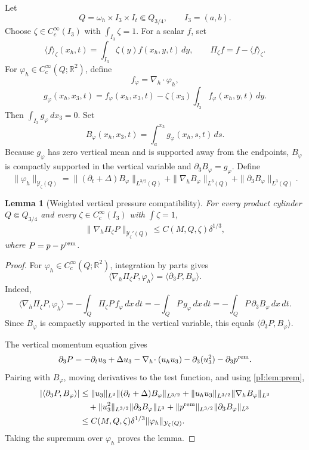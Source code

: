 \documentclass[11pt]{article}
\numberwithin{equation}{section}
\theoremstyle{plain}
\newtheorem{lemma}{Lemma}[section]
\theoremstyle{definition}
\theoremstyle{remark}
\newcommand{\R}{\mathbb R}
\newcommand{\nabh}{\nabla_h}
\newcommand{\divh}{\nabla_h\!\cdot}
\newcommand{\calY}{\mathcal Y}
\begin{document}
Let
\[
        Q=\omega_h\times I_3\times I_t\Subset Q_{3/4},
        \qquad
        I_3=(a,b).
\]
Choose \(\zeta\in C_c^\infty(I_3)\) with \(\int_{I_3}\zeta=1\).  For a scalar \(f\), set
\[
        \langle f\rangle_\zeta(x_h,t)=\int_{I_3}\zeta(y)f(x_h,y,t)\,dy,
        \qquad
        \Pi_\zeta f=f-\langle f\rangle_\zeta.
\]
For \(\varphi_h\in C_c^\infty(Q;\R^2)\), define
\[
        f_\varphi=\divh \varphi_h,
\]
\[
        g_\varphi(x_h,x_3,t)
        =f_\varphi(x_h,x_3,t)
        -\zeta(x_3)\int_{I_3}f_\varphi(x_h,y,t)\,dy.
\]
Then \(\int_{I_3}g_\varphi\,dx_3=0\).  Set
\[
        B_\varphi(x_h,x_3,t)=\int_a^{x_3}g_\varphi(x_h,s,t)\,ds.
\]
Because \(g_\varphi\) has zero vertical mean and is supported away from the endpoints, \(B_\varphi\) is compactly supported in the vertical variable and \(\partial_3B_\varphi=g_\varphi\).  Define
\[
        \|\varphi_h\|_{\calY_\zeta(Q)}
        =\| (\partial_t+\Delta)B_\varphi\|_{L^{3/2}(Q)}
        +\|\nabh B_\varphi\|_{L^3(Q)}
        +\|\partial_3B_\varphi\|_{L^3(Q)}.
\]

\begin{lemma}[Weighted vertical pressure compatibility]\label{pI:lem:weighted-pressure}
For every product cylinder \(Q\Subset Q_{3/4}\) and every \(\zeta\in C_c^\infty(I_3)\) with \(\int\zeta=1\),
\[
        \|\nabh\Pi_\zeta P\|_{\calY_\zeta'(Q)}
        \le C(M,Q,\zeta)\delta^{1/3},
\]
where \(P=p-p^{\rm rem}\).
\end{lemma}

\begin{proof}
For \(\varphi_h\in C_c^\infty(Q;\R^2)\), integration by parts gives
\begin{equation}\label{pI:eq:weighted-identity}
        \langle \nabh\Pi_\zeta P,\varphi_h\rangle
        =\langle \partial_3P,B_\varphi\rangle.
\end{equation}
Indeed,
\[
\langle \nabh\Pi_\zeta P,\varphi_h\rangle
=-\int_Q \Pi_\zeta P\,f_\varphi\,dx\,dt
=-\int_Q P\,g_\varphi\,dx\,dt
=-\int_Q P\,\partial_3B_\varphi\,dx\,dt.
\]
Since \(B_\varphi\) is compactly supported in the vertical variable, this equals \(\langle \partial_3P,B_\varphi\rangle\).

The vertical momentum equation gives
\[
        \partial_3P
        =-\partial_tu_3+\Delta u_3-
        \divh(u_hu_3)-\partial_3(u_3^2)-\partial_3p^{\rm rem}.
\]
Pairing with \(B_\varphi\), moving derivatives to the test function, and using \cref{pI:lem:prem},
\[
\begin{aligned}
|\langle\partial_3P,B_\varphi\rangle|
&\le \|u_3\|_{L^3}\|(\partial_t+\Delta)B_\varphi\|_{L^{3/2}}
+\|u_hu_3\|_{L^{3/2}}\|\nabh B_\varphi\|_{L^3}\\
&\quad+\|u_3^2\|_{L^{3/2}}\|\partial_3B_\varphi\|_{L^3}
+\|p^{\rm rem}\|_{L^{3/2}}\|\partial_3B_\varphi\|_{L^3}\\
&\le C(M,Q,\zeta)\delta^{1/3}\|\varphi_h\|_{\calY_\zeta(Q)}.
\end{aligned}
\]
Taking the supremum over \(\varphi_h\) proves the lemma.
\end{proof}
\end{document}
